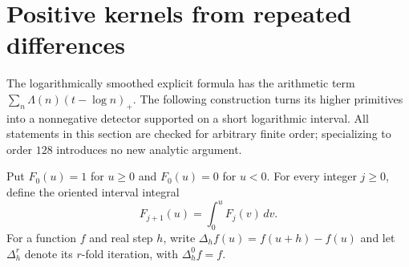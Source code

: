 \section{Positive kernels from repeated differences}

The logarithmically smoothed explicit formula has the arithmetic term
$\sum_n\Lambda(n)(t-\log n)_+$.  The following construction turns its
higher primitives into a nonnegative detector supported on a short
logarithmic interval.  All statements in this section are checked for
arbitrary finite order; specializing to order $128$ introduces no new
analytic argument.

\begin{definition}
\label{kernel:primitives}
\leanok
Put $F_0(u)=1$ for $u\geq0$ and $F_0(u)=0$ for $u<0$.
For every integer $j\geq0$, define the oriented interval integral
\[
 F_{j+1}(u)=\int_0^uF_j(v)\,dv.
\]
For a function $f$ and real step $h$, write
$\Delta_hf(u)=f(u+h)-f(u)$ and let $\Delta_h^r$ denote its $r$-fold
iteration, with $\Delta_h^0f=f$.
\end{definition}

